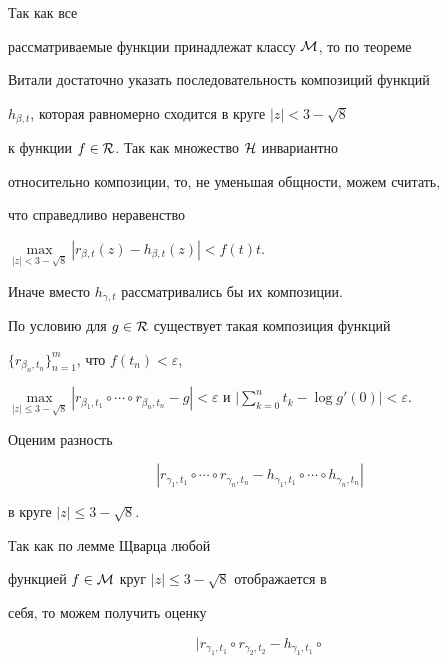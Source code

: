 \begin{pf}


Так как все


рассматриваемые функции принадлежат классу $\cal M$, то по теореме


Витали достаточно указать последовательность композиций функций


$h_{\beta,t}$, которая равномерно сходится в круге $|z|<3-\sqrt8$


к функции $f\in {\cal R}$. Так как множество $\cal H$ инвариантно


относительно композиции, то, не уменьшая общности, можем считать,


что справедливо неравенство


$\max\limits_{|z|<3-\sqrt8}|r_{\beta,t}(z)-h_{\beta,t}(z)|< f(t)t$.


Иначе вместо $h_{\gamma,t}$ рассматривались бы их композиции.


По условию для $g\in\cal R$ существует такая композиция функций


$\{r_{\beta_n,t_n}\}_{n=1}^{m}$, что $f(t_n)<\varepsilon$,


$\max\limits_{|z|\leqslant3-\sqrt{8}}|r_{\beta_1,t_1}\circ\dotsb\circ


r_{\beta_n,t_n}-g|<\varepsilon$ и $\Big|\sum\limits_{k=0}^{n}t_k-\log


g'(0)\Big|<\varepsilon$.





Оценим разность


\begin{equation}


\label{otz} |r_{\gamma_1,t_1}\circ\dotsb\circ


r_{\gamma_n,t_n}-h_{\gamma_1,t_1}\circ\dotsb\circ


h_{\gamma_n,t_n}|


\end{equation}


в круге $|z|\leqslant3-\sqrt{8}$.


Так как по лемме Щварца любой


функцией $f\in\cal M$ круг $|z|\leqslant3-\sqrt{8}$ отображается в


себя, то можем получить оценку


\begin{equation}


\label{estimate2} |r_{\gamma_1,t_1}\circ


r_{\gamma_2,t_2}-h_{\gamma_1,t_1}\circ



\end{equation}
\end{pf}
